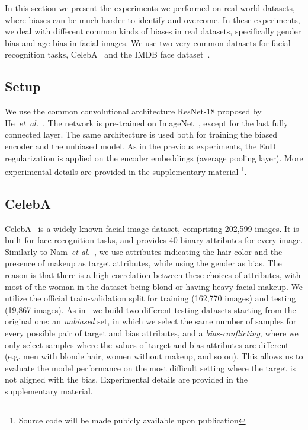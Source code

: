 In this section we present the experiments we performed on real-world datasets, where biases can be much harder to identify and overcome. In these experiments, we deal with different common kinds of biases in real datasets, 
specifically gender bias and age bias in facial images.
We use two very common datasets for facial recognition tasks, CelebA~\cite{liu2015faceattributes} and the IMDB face dataset~\cite{Rothe-IJCV-2018}. 

\subsection{Setup}
We use the common convolutional architecture ResNet-18 proposed by He~\emph{et~al.}~\cite{he2016deep}. The network is pre-trained on ImageNet~\cite{imagenetcvpr09}, except for the last fully connected layer. The same architecture is used both for training the biased encoder and the unbiased model. As in the previous experiments, the EnD regularization is applied on the encoder embeddings (average pooling layer). More experimental details are provided in the supplementary material
\footnote{Source code will be made pubicly available upon publication}.


\subsection{CelebA}
CelebA~\cite{liu2015faceattributes} is a widely known facial image dataset, comprising 202,599 images. It is built for face-recognition tasks, and provides 40 binary attributes for every image. 
Similarly to Nam~\emph{et al.}~\cite{nam2020learning}, we use attributes indicating the hair color and the presence of makeup as target attributes, while using the gender as bias. The reason is that there is a high correlation between these choices of attributes, with most of the woman in the dataset being blond or having heavy facial makeup.  We utilize the official train-validation split for training (162,770 images) and testing (19,867 images). As in~\cite{nam2020learning} we build two different testing datasets starting from the original one: an \emph{unbiased} set, in which we select the same number of samples for every possible pair of target and bias attributes, and a \emph{bias-conflicting}, where we only select samples where the values of target and bias attributes are different (e.g. men with blonde hair, women without makeup, and so on). This allows us to evaluate the model performance on the most difficult setting where the target is not aligned with the bias. Experimental details are provided in
the supplementary material. %

